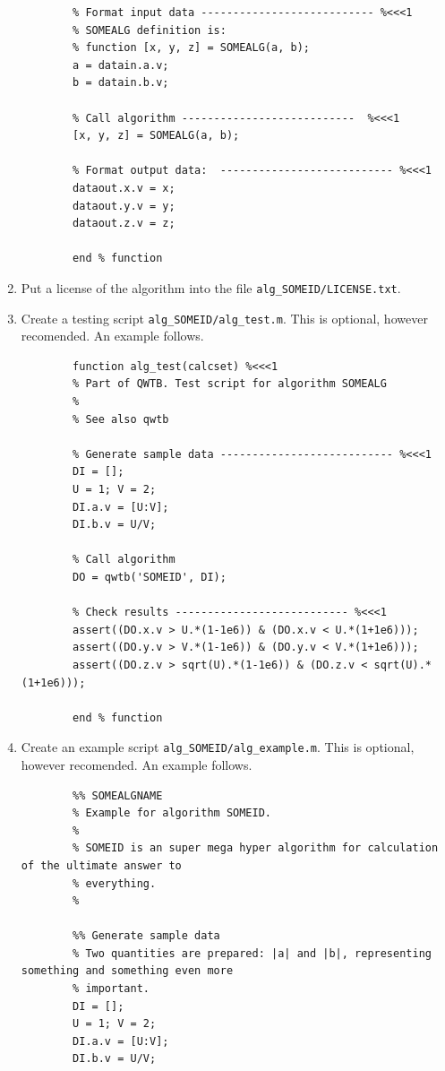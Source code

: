 \documentclass[12pt,a4paper,oneside]{report} %
\begin{document}
\begin{enumerate}
\begin{lstlisting}
        % Format input data --------------------------- %<<<1
        % SOMEALG definition is:
        % function [x, y, z] = SOMEALG(a, b);
        a = datain.a.v;
        b = datain.b.v;

        % Call algorithm ---------------------------  %<<<1
        [x, y, z] = SOMEALG(a, b);

        % Format output data:  --------------------------- %<<<1
        dataout.x.v = x;
        dataout.y.v = y;
        dataout.z.v = z;

        end % function
        \end{lstlisting}

        \item Put a license of the algorithm into the file {\tt alg\_SOMEID/LICENSE.txt}.

        \item Create a testing script {\tt alg\_SOMEID/alg\_test.m}. This is optional, however
        recomended. An example follows.
        \begin{lstlisting}
        function alg_test(calcset) %<<<1
        % Part of QWTB. Test script for algorithm SOMEALG
        %
        % See also qwtb

        % Generate sample data --------------------------- %<<<1
        DI = [];
        U = 1; V = 2;
        DI.a.v = [U:V];
        DI.b.v = U/V;

        % Call algorithm
        DO = qwtb('SOMEID', DI);

        % Check results --------------------------- %<<<1
        assert((DO.x.v > U.*(1-1e6)) & (DO.x.v < U.*(1+1e6)));
        assert((DO.y.v > V.*(1-1e6)) & (DO.y.v < V.*(1+1e6)));
        assert((DO.z.v > sqrt(U).*(1-1e6)) & (DO.z.v < sqrt(U).*(1+1e6)));

        end % function
        \end{lstlisting}

        \item Create an example script {\tt alg\_SOMEID/alg\_example.m}. This is optional, however
        recomended. An example follows.
        \begin{lstlisting}
        %% SOMEALGNAME
        % Example for algorithm SOMEID.
        %
        % SOMEID is an super mega hyper algorithm for calculation of the ultimate answer to
        % everything.
        %

        %% Generate sample data
        % Two quantities are prepared: |a| and |b|, representing something and something even more
        % important.
        DI = [];
        U = 1; V = 2;
        DI.a.v = [U:V];
        DI.b.v = U/V;


\end{lstlisting}
\end{enumerate}
\end{document}
